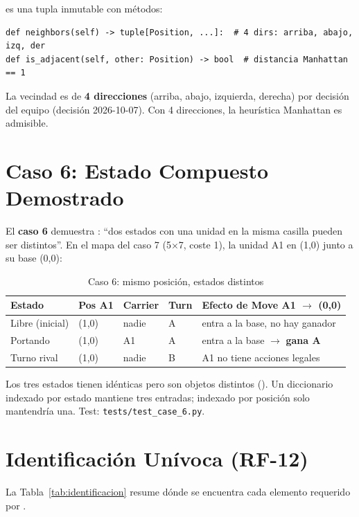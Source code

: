 es una tupla inmutable  con métodos:

\begin{verbatim}
def neighbors(self) -> tuple[Position, ...]:  # 4 dirs: arriba, abajo, izq, der
def is_adjacent(self, other: Position) -> bool  # distancia Manhattan == 1
\end{verbatim}

La vecindad es de \textbf{4 direcciones} (arriba, abajo, izquierda, derecha) por decisión
del equipo (decisión 2026-10-07). Con 4 direcciones, la heurística Manhattan es admisible.

\section{Caso 6: Estado Compuesto Demostrado}
\label{sec:caso6}

El \textbf{caso 6} demuestra : ``dos estados con una unidad en la misma casilla pueden
ser distintos''. En el mapa del caso 7 (5$\times$7, coste 1), la unidad A1 en (1,0) junto a su
base (0,0):

\begin{table}[H]
\centering
\caption{Caso 6: mismo posición, estados distintos}
\begin{tabular}{lllll}
\toprule
\textbf{Estado} & \textbf{Pos A1} & \textbf{Carrier} & \textbf{Turn} & \textbf{Efecto de Move A1 $\to$ (0,0)} \\
\midrule
Libre (inicial) & (1,0) & nadie & A & entra a la base, no hay ganador \\
Portando & (1,0) & A1 & A & entra a la base $\to$ \textbf{gana A} \\
Turno rival & (1,0) & nadie & B & A1 no tiene acciones legales \\
\bottomrule
\end{tabular}
\end{table}
\label{tab:caso6}

Los tres estados tienen  idénticas pero son objetos distintos
(). Un diccionario indexado por estado mantiene tres entradas;
indexado por posición solo mantendría una. Test: \texttt{tests/test\_case\_6.py}.

\section{Identificación Unívoca (RF-12)}
\label{sec:identificacion-univoca}

La Tabla~\ref{tab:identificacion} resume dónde se encuentra cada elemento requerido por .

